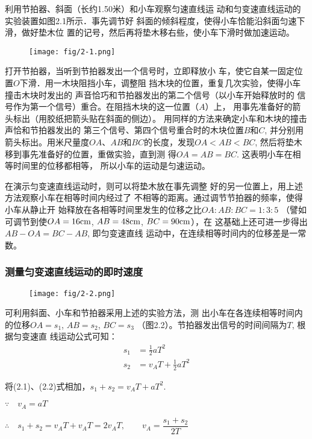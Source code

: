 利用节拍器、斜面（长约1.50米）和小车观察匀速直线运
动和匀变速直线运动的实验装置如图2.1所示．事先调节好
斜面的倾斜程度，使得小车恰能沿斜面匀速下滑，做好垫木位
置的记号，然后再将垫木移右些，使小车下滑时做加速运动。
\begin{figure}[htp]
    \centering
    \texttt{[image: fig/2-1.png]}
    \caption{}
\end{figure}

打开节拍器，当听到节拍器发出一个信号时，立即释放小
车，使它自某一固定位置$O$下滑．用一木块阻挡小车，调整阻
挡木块的位置，重复几次实验，使得小车撞击木块时发出的
声音恰巧和节拍器发出的第二个信号（以小车开始释放时的
信号作为第一个信号）重合。在阻挡木块的这一位置（$A$）上，
用事先准备好的箭头标出（用胶纸把箭头贴在斜面的侧边）。
用同样的方法来确定小车和木块的撞击声恰和节拍器发出的
第三个信号、第四个信号重合时的木块位置$B$和$C$, 并分别用
箭头标出。用米尺量度$OA$、$AB$和$BC$的长度，发现$OA<AB
<BC$, 然后将垫木移到事先准备好的位置，重做实验，直到测
得$OA=AB=BC$. 这表明小车在相等时间里的位移都相等，
所以小车的运动是匀速运动。

在演示匀变速直线运动时，则可以将垫木放在事先调整
好的另一位置上，用上述方法观察小车在相等时间内经过了
不相等的距离。通过调节节拍器的频率，使得小车从静止开
始释放在各相等时间里发生的位移之比$OA:AB:BC=1:3:5$
（譬如可调节到使$OA=16{\rm cm}$, $AB=48{\rm cm}$, $BC=90{\rm cm}$），在
这基础上还可进一步得出$AB-OA=BC-AB$, 即匀变速直线
运动中，在连续相等时间内的位移差是一常数。

\subsubsection{测量匀变速直线运动的即时速度}

\begin{figure}[htp]
    \centering
    \texttt{[image: fig/2-2.png]}
    \caption{}
\end{figure}


可利用斜面、小车和节拍器采用上述的实验方法，测
出小车在各连续相等时间内的位移$OA=s_1$, $AB=s_2$, $BC=s_3$
（图2.2）。节拍器发出信号的时间间隔为$T$, 根据匀变速直
线运动公式可知：
\begin{align}
    s_1&=\frac{1}{2}aT^2\\
    s_2&=v_AT+\frac{1}{2}aT^2
\end{align}

将(2.1)、(2.2)式相加，$s_1+s_2=v_A T+aT^2$.

$\because\quad v_A=aT$

$\therefore\quad s_1+s_2=v_AT+v_AT=2v_AT,\qquad v_A=\dfrac{s_1+s_2}{2T}$

